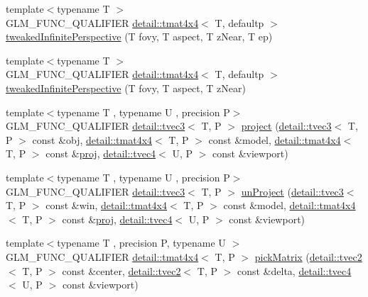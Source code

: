 \begin{DoxyCompactItemize}
\item 
{\footnotesize template$<$typename T $>$ }\\G\+L\+M\+\_\+\+F\+U\+N\+C\+\_\+\+Q\+U\+A\+L\+I\+F\+I\+ER \hyperlink{structglm_1_1detail_1_1tmat4x4}{detail\+::tmat4x4}$<$ T, defaultp $>$ \hyperlink{group__gtc__matrix__transform_gade8abc58c0ac541163e872eb66f3e5de}{tweaked\+Infinite\+Perspective} (T fovy, T aspect, T z\+Near, T ep)
\item 
{\footnotesize template$<$typename T $>$ }\\G\+L\+M\+\_\+\+F\+U\+N\+C\+\_\+\+Q\+U\+A\+L\+I\+F\+I\+ER \hyperlink{structglm_1_1detail_1_1tmat4x4}{detail\+::tmat4x4}$<$ T, defaultp $>$ \hyperlink{group__gtc__matrix__transform_ga9d67732836d71a79dc21eb8f87603cb7}{tweaked\+Infinite\+Perspective} (T fovy, T aspect, T z\+Near)
\item 
{\footnotesize template$<$typename T , typename U , precision P$>$ }\\G\+L\+M\+\_\+\+F\+U\+N\+C\+\_\+\+Q\+U\+A\+L\+I\+F\+I\+ER \hyperlink{structglm_1_1detail_1_1tvec3}{detail\+::tvec3}$<$ T, P $>$ \hyperlink{group__gtc__matrix__transform_ga41227b7b98882dcbaa8dab52df372c7b}{project} (\hyperlink{structglm_1_1detail_1_1tvec3}{detail\+::tvec3}$<$ T, P $>$ const \&obj, \hyperlink{structglm_1_1detail_1_1tmat4x4}{detail\+::tmat4x4}$<$ T, P $>$ const \&model, \hyperlink{structglm_1_1detail_1_1tmat4x4}{detail\+::tmat4x4}$<$ T, P $>$ const \&\hyperlink{group__gtx__projection_gadf29123bcf748fc9d6fb0998192184cf}{proj}, \hyperlink{structglm_1_1detail_1_1tvec4}{detail\+::tvec4}$<$ U, P $>$ const \&viewport)
\item 
{\footnotesize template$<$typename T , typename U , precision P$>$ }\\G\+L\+M\+\_\+\+F\+U\+N\+C\+\_\+\+Q\+U\+A\+L\+I\+F\+I\+ER \hyperlink{structglm_1_1detail_1_1tvec3}{detail\+::tvec3}$<$ T, P $>$ \hyperlink{group__gtc__matrix__transform_ga4b0a9086d15e2a743ecd7b6128146af1}{un\+Project} (\hyperlink{structglm_1_1detail_1_1tvec3}{detail\+::tvec3}$<$ T, P $>$ const \&win, \hyperlink{structglm_1_1detail_1_1tmat4x4}{detail\+::tmat4x4}$<$ T, P $>$ const \&model, \hyperlink{structglm_1_1detail_1_1tmat4x4}{detail\+::tmat4x4}$<$ T, P $>$ const \&\hyperlink{group__gtx__projection_gadf29123bcf748fc9d6fb0998192184cf}{proj}, \hyperlink{structglm_1_1detail_1_1tvec4}{detail\+::tvec4}$<$ U, P $>$ const \&viewport)
\item 
{\footnotesize template$<$typename T , precision P, typename U $>$ }\\G\+L\+M\+\_\+\+F\+U\+N\+C\+\_\+\+Q\+U\+A\+L\+I\+F\+I\+ER \hyperlink{structglm_1_1detail_1_1tmat4x4}{detail\+::tmat4x4}$<$ T, P $>$ \hyperlink{group__gtc__matrix__transform_ga0fb64f04bf5ad52523fcd4b10b46aff6}{pick\+Matrix} (\hyperlink{structglm_1_1detail_1_1tvec2}{detail\+::tvec2}$<$ T, P $>$ const \&center, \hyperlink{structglm_1_1detail_1_1tvec2}{detail\+::tvec2}$<$ T, P $>$ const \&delta, \hyperlink{structglm_1_1detail_1_1tvec4}{detail\+::tvec4}$<$ U, P $>$ const \&viewport)

\end{DoxyCompactItemize}
